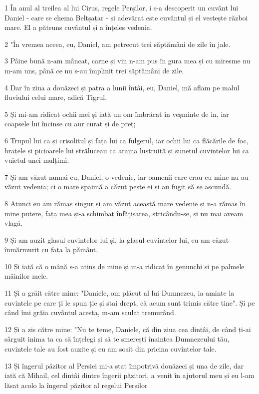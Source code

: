 \par 1 În anul al treilea al lui Cirus, regele Perșilor, i s-a descoperit un cuvânt lui Daniel - care se chema Beltșațar - și adevărat este cuvântul și el vestește război mare. El a pătruns cuvântul și a înțeles vedenia.
\par 2 "În vremea aceea, eu, Daniel, am petrecut trei săptămâni de zile în jale.
\par 3 Pâine bună n-am mâncat, carne și vin n-am pus în gura mea și cu miresme nu m-am uns, până ce nu s-au împlinit trei săptămâni de zile.
\par 4 Dar în ziua a douăzeci și patra a lunii întâi, eu, Daniel, mă aflam pe malul fluviului celui mare, adică Tigrul,
\par 5 Și mi-am ridicat ochii mei și iată un om îmbrăcat în veșminte de in, iar coapsele lui încinse cu aur curat și de preț;
\par 6 Trupul lui ca și crisolitul și fața lui ca fulgerul, iar ochii lui ca flăcările de foc, brațele și picioarele lui străluceau ca arama lustruită și sunetul cuvintelor lui ca vuietul unei mulțimi.
\par 7 Și am văzut numai eu, Daniel, o vedenie, iar oamenii care erau cu mine nu au văzut vedenia; ci o mare spaimă a căzut peste ei și au fugit să se ascundă.
\par 8 Atunci eu am rămas singur și am văzut această mare vedenie și n-a rămas în mine putere, fața mea și-a schimbat înfățișarea, stricându-se, și nu mai aveam vlagă.
\par 9 Și am auzit glasul cuvintelor lui și, la glasul cuvintelor lui, eu am căzut înmărmurit cu fața la pământ.
\par 10 Și iată că o mână s-a atins de mine și m-a ridicat în genunchi și pe palmele mâinilor mele.
\par 11 Și a grăit către mine: "Daniele, om plăcut al lui Dumnezeu, ia aminte la cuvintele pe care ți le spun ție și stai drept, că acum sunt trimis către tine". Și pe când îmi grăia cuvântul acesta, m-am sculat tremurând.
\par 12 Și a zis către mine: "Nu te teme, Daniele, că din ziua cea dintâi, de când ți-ai sârguit inima ta ca să înțelegi și să te smerești înaintea Dumnezeului tău, cuvintele tale au fost auzite și eu am sosit din pricina cuvintelor tale.
\par 13 Și îngerul păzitor al Persiei mi-a stat împotrivă douăzeci și una de zile, dar iată că Mihail, cel dintâi dintre îngerii păzitori, a venit în ajutorul meu și eu l-am lăsat acolo la îngerul păzitor al regelui Perșilor
